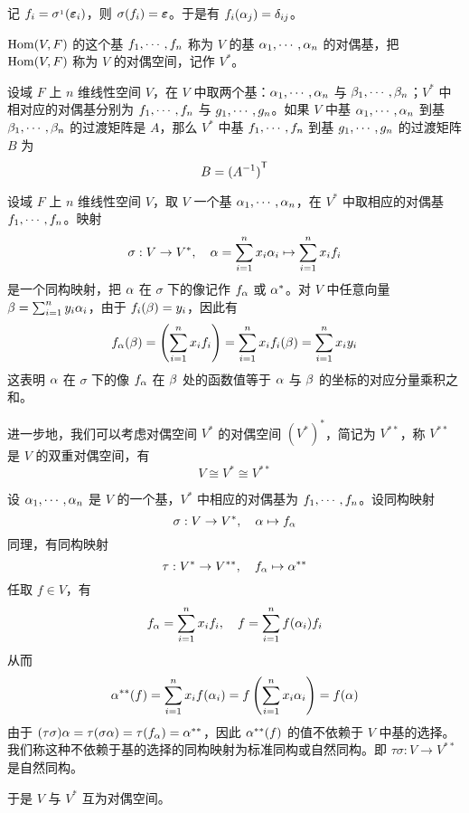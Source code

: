记 $f_i = \sigma^{_1}(\boldsymbol{\varepsilon}_i)$，则 $\sigma(f_i) = \boldsymbol{\varepsilon}$。于是有 $f_i(\alpha_j) = \delta_{ij}$。

$\operatorname{Hom}(V,F)$ 的这个基 $f_1,\cdots,f_n$ 称为 $V$ 的基 $\alpha_1,\cdots,\alpha_n$ 的对偶基，把 $\operatorname{Hom}(V,F)$ 称为 $V$ 的对偶空间，记作 $V^*$。

\begin{theorem}
    设域 $F$ 上 $n$ 维线性空间 $V$，在 $V$ 中取两个基：$\alpha_1,\cdots,\alpha_n$ 与 $\beta_1,\cdots,\beta_n$；$V^*$ 中相对应的对偶基分别为 $f_1,\cdots,f_n$ 与 $g_1,\cdots,g_n$。如果 $V$ 中基 $\alpha_1,\cdots,\alpha_n$ 到基 $\beta_1,\cdots,\beta_n$ 的过渡矩阵是 $A$，那么 $V^*$ 中基 $f_1,\cdots,f_n$ 到基 $g_1,\cdots,g_n$ 的过渡矩阵 $B$ 为
    \[ B = {(A^{-1})}^\mathsf{T} \]
\end{theorem}

设域 $F$ 上 $n$ 维线性空间 $V$，取 $V$ 一个基 $\alpha_1,\cdots,\alpha_n$，在 $V^*$ 中取相应的对偶基 $f_1,\cdots,f_n$。映射
\[ \sigma : V \to V^*, \quad \alpha = \sum_{i=1}^n x_i\alpha_i \mapsto \sum_{i=1}^n x_if_i \]
是一个同构映射，把 $\alpha$ 在 $\sigma$ 下的像记作 $f_\alpha$ 或 $\alpha^*$。对 $V$ 中任意向量 $\beta = \sum_{i=1}^n y_i\alpha_i$，由于 $f_i(\beta) = y_i$，因此有
\[ f_\alpha(\beta) = \left( \sum_{i=1}^n x_if_i \right) = \sum_{i=1}^n x_if_i(\beta) = \sum_{i=1}^n x_iy_i \]
这表明 $\alpha$ 在 $\sigma$ 下的像 $f_\alpha$ 在 $\beta$ 处的函数值等于 $\alpha$ 与 $\beta$ 的坐标的对应分量乘积之和。

进一步地，我们可以考虑对偶空间 $V^*$ 的对偶空间 $(V^*)^*$，简记为 $V^{**}$，称 $V^{**}$ 是 $V$ 的双重对偶空间，有
\[ V \cong V^{*} \cong V^{**} \]

设 $\alpha_1,\cdots,\alpha_n$ 是 $V$ 的一个基，$V^*$ 中相应的对偶基为 $f_1,\cdots,f_n$。设同构映射 
\[ \sigma : V \to V^*, \quad \alpha \mapsto f_\alpha \]
同理，有同构映射
\[ \tau : V^* \to V^{**}, \quad f_\alpha \mapsto \alpha^{**} \]
任取 $f \in V$，有
\[ f_\alpha = \sum_{i=1}^n x_if_i, \quad f = \sum_{i=1}^n f(\alpha_i) f_i \]
从而
\[ \alpha^{**}(f) = \sum_{i=1}^n x_if(\alpha_i) = f\left( \sum_{i=1}^n x_i\alpha_i \right) = f(\alpha) \]
由于  $(\tau\sigma)\alpha = \tau(\sigma\alpha) = \tau(f_\alpha) = \alpha^{**}$，因此 $\alpha^{**}(f)$ 的值不依赖于 $V$ 中基的选择。我们称这种不依赖于基的选择的同构映射为标准同构或自然同构。即 $\tau\sigma : V \to V^{**}$ 是自然同构。

于是 $V$ 与 $V^{*}$ 互为对偶空间。
